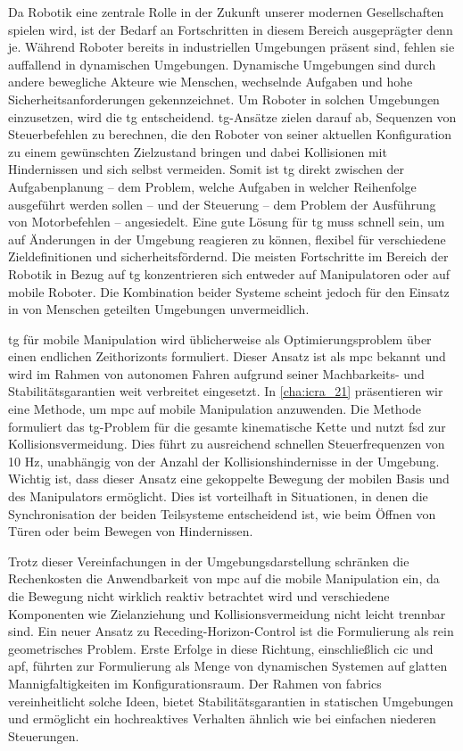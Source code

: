 Da Robotik eine zentrale Rolle in der Zukunft unserer modernen Gesellschaften
spielen wird, ist der Bedarf an Fortschritten in diesem Bereich ausgeprägter
denn je. Während Roboter bereits in industriellen Umgebungen präsent sind,
fehlen sie auffallend in dynamischen Umgebungen. Dynamische Umgebungen sind
durch andere bewegliche Akteure wie Menschen, wechselnde Aufgaben und hohe
Sicherheitsanforderungen gekennzeichnet. Um Roboter in solchen Umgebungen
einzusetzen, wird die \ac{tg} entscheidend. \Ac{tg}-Ansätze zielen darauf ab,
Sequenzen von Steuerbefehlen zu berechnen, die den Roboter von seiner aktuellen
Konfiguration zu einem gewünschten Zielzustand bringen und dabei Kollisionen mit
Hindernissen und sich selbst vermeiden. Somit ist \ac{tg} direkt zwischen der
Aufgabenplanung – dem Problem, welche Aufgaben in welcher Reihenfolge ausgeführt
werden sollen – und der Steuerung – dem Problem der Ausführung von Motorbefehlen
– angesiedelt. Eine gute Lösung für \ac{tg} muss schnell sein, um auf Änderungen
in der Umgebung reagieren zu können, flexibel für verschiedene Zieldefinitionen
und sicherheitsfördernd. Die meisten Fortschritte im Bereich der Robotik in
Bezug auf \ac{tg} konzentrieren sich entweder auf Manipulatoren oder auf mobile
Roboter. Die Kombination beider Systeme scheint jedoch für den Einsatz in von
Menschen geteilten Umgebungen unvermeidlich.

\Ac{tg} für mobile Manipulation wird üblicherweise als Optimierungsproblem über
einen endlichen Zeithorizonts formuliert. Dieser Ansatz ist als \ac{mpc} bekannt
und wird im Rahmen von autonomen Fahren aufgrund seiner Machbarkeits- und
Stabilitätsgarantien weit verbreitet eingesetzt. In \cref{cha:icra_21}
präsentieren wir eine Methode, um \ac{mpc} auf mobile Manipulation anzuwenden.
Die Methode formuliert das \ac{tg}-Problem für die gesamte kinematische Kette
und nutzt \ac{fsd} zur Kollisionsvermeidung. Dies führt zu ausreichend schnellen
Steuerfrequenzen von 10 Hz, unabhängig von der Anzahl der Kollisionshindernisse
in der Umgebung. Wichtig ist, dass dieser Ansatz eine gekoppelte Bewegung der
mobilen Basis und des Manipulators ermöglicht. Dies ist vorteilhaft in
Situationen, in denen die Synchronisation der beiden Teilsysteme entscheidend
ist, wie beim Öffnen von Türen oder beim Bewegen von Hindernissen.

Trotz dieser Vereinfachungen in der Umgebungsdarstellung schränken die
Rechenkosten die Anwendbarkeit von \ac{mpc} auf die mobile Manipulation ein, da
die Bewegung nicht wirklich reaktiv betrachtet wird und verschiedene Komponenten
wie Zielanziehung und Kollisionsvermeidung nicht leicht trennbar sind. Ein neuer
Ansatz zu Receding-Horizon-Control ist die Formulierung als rein
geometrisches Problem. Erste Erfolge in diese Richtung, einschließlich \ac{cic}
und \ac{apf}, führten zur Formulierung als Menge von dynamischen Systemen auf
glatten Mannigfaltigkeiten im Konfigurationsraum. Der Rahmen von \acf{fabrics}
vereinheitlicht solche Ideen, bietet Stabilitätsgarantien in statischen
Umgebungen und ermöglicht ein hochreaktives Verhalten ähnlich wie bei einfachen
niederen Steuerungen.

